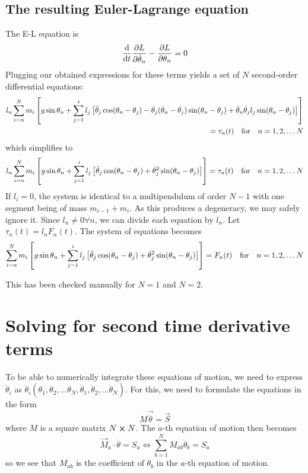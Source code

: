 \documentclass[12pt]{article}
\begin{document}
	\subsection{The resulting Euler-Lagrange equation}
	The E-L equation is
	$$\dv{t}\pdv{L}{\dot{\theta}_n}-\pdv{L}{\theta_n}=0$$
	Plugging our obtained expressions for these terms yields a set of $N$ second-order differential equations:
	\begin{eqnarray*}
	l_n\sum_{i=n}^N m_i\left[g \sin{\theta_n} + \sum_{j=1}^il_j\left[ \ddot{\theta}_j\cos(\theta_n-\theta_j)-\dot{\theta}_j(\dot{\theta}_n-\dot{\theta}_j)\sin(\theta_n-\theta_j)   + \dot{\theta}_n \dot{\theta}_j l_j \sin(\theta_n - \theta_j) \right]     \right]\\
	=\tau_n(t)\qq{for}n=1,2,\dots N
	\end{eqnarray*}
	which simplifies to
	\begin{eqnarray*}
	l_n\sum_{i=n}^N m_i\left[g \sin{\theta_n} + \sum_{j=1}^il_j\left[ \ddot{\theta}_j\cos(\theta_n-\theta_j)+\dot{\theta}_j^2 \sin(\theta_n-\theta_j) \right]     \right]=\tau_n(t)\qq{for}n=1,2,\dots N
	\end{eqnarray*}
	If $l_i = 0$, the system is identical to a multipendulum of order $N-1$ with one segment being of mass $m_{i-1}+m_i$. As this produces a degeneracy, we may safely ignore it. Since $l_n\neq 0\forall n$, we can divide each equation by $l_n$. Let $\tau_n(t)=l_nF_n(t)$. The system of equations becomes
	\begin{eqnarray*}
	\sum_{i=n}^N m_i\left[g \sin{\theta_n} + \sum_{j=1}^il_j\left[ \ddot{\theta}_j\cos(\theta_n-\theta_j)+\dot{\theta}_j^2 \sin(\theta_n-\theta_j) \right]     \right]=F_n(t)\qq{for}n=1,2,\dots N
	\end{eqnarray*}
	
	This has been checked manually for $N=1$ and $N=2$.
	
	\section{Solving for second time derivative terms}
	
	To be able to numerically integrate these equations of motion, we need to express $\ddot{\theta}_i$ as $\ddot{\theta}_i(\theta_1,\theta_2,\dots \theta_N, \dot{\theta}_1, \dot{\theta}_2,\dots \dot{\theta}_N)$. For this, we need to formulate the equations in the form
	$$M\vec{\ddot{\theta}}=\vec{S}$$
	where $M$ is a square matrix $N\cross N$. The $a$-th equation of motion then becomes
	$$\vec{M}_a \cdot \ddot{\theta} = S_a \iff \sum_{b=1}^N M_{ab}\ddot{\theta}_b=S_a$$
	so we see that $M_{ab}$ is the coefficient of $\ddot{\theta}_b$ in the $a$-th equation of motion.
	
\end{document}
